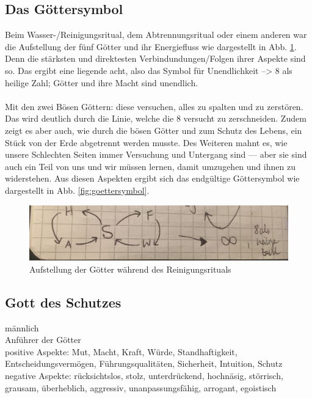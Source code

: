\subsection{Das Göttersymbol} \label{sec:goettersymbol}
Beim Wasser-/Reinigungsritual, dem Abtrennungsritual oder einem anderen war die Aufstellung der fünf Götter und ihr Energiefluss wie dargestellt in Abb. \ref{fig:goetteraufstellung}. Denn die stärksten und direktesten Verbindundungen/Folgen ihrer Aspekte sind so. Das ergibt eine liegende acht, also das Symbol für Unendlichkeit --> 8 als heilige Zahl; Götter und ihre Macht sind unendlich.\\
\\
Mit den zwei Bösen Göttern: diese versuchen, alles zu spalten und zu zerstören. Das wird deutlich durch die Linie, welche die 8 versucht zu zerschneiden. Zudem zeigt es aber auch, wie durch die bösen Götter und zum Schutz des Lebens, ein Stück von der Erde abgetrennt werden musste. Des Weiteren mahnt es, wie unsere Schlechten Seiten immer Versuchung und Untergang sind — aber sie sind auch ein Teil von uns und wir müssen lernen, damit umzugehen und ihnen zu widerstehen. Aus diesen Aspekten ergibt sich das endgültige Göttersymbol wie dargestellt in Abb. \ref{fig:goettersymbol}.\\

\begin{figure}
	\centering
	\includegraphics[width=0.7\linewidth]{Abbildungen/Gesellschaft/GoetteraufstellungbeiReinigungsritual}
	\caption{Aufstellung der Götter während des Reinigungsrituals}
	\label{fig:goetteraufstellung}
\end{figure}




\subsection{Gott des Schutzes}
männlich\\
Anführer der Götter\\
positive Aspekte: Mut, Macht, Kraft, Würde, Standhaftigkeit, Entscheidungsvermögen, Führungsqualitäten, Sicherheit, Intuition, Schutz\\
negative Aspekte: rücksichtslos, stolz, unterdrückend, hochnäsig, störrisch, grausam, überheblich, aggressiv, unanpassungsfähig, arrogant, egoistisch
